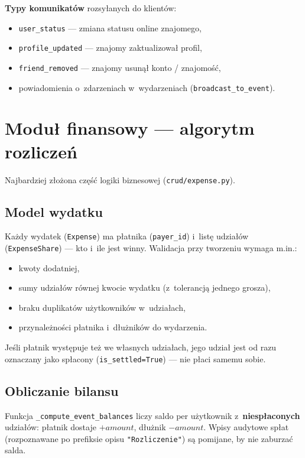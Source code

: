 \documentclass[11pt,a4paper]{article}
\begin{document}
\textbf{Typy komunikatów} rozsyłanych do klientów:
\begin{itemize}[noitemsep]
    \item \texttt{user\_status} --- zmiana statusu online znajomego,
    \item \texttt{profile\_updated} --- znajomy zaktualizował profil,
    \item \texttt{friend\_removed} --- znajomy usunął konto / znajomość,
    \item powiadomienia o~zdarzeniach w~wydarzeniach (\texttt{broadcast\_to\_event}).
\end{itemize}

\section{Moduł finansowy --- algorytm rozliczeń}

Najbardziej złożona część logiki biznesowej (\texttt{crud/expense.py}).

\subsection{Model wydatku}
Każdy wydatek (\texttt{Expense}) ma płatnika (\texttt{payer\_id}) i~listę udziałów
(\texttt{ExpenseShare}) --- kto i~ile jest winny. Walidacja przy tworzeniu wymaga m.in.:
\begin{itemize}[noitemsep]
    \item kwoty dodatniej,
    \item sumy udziałów równej kwocie wydatku (z~tolerancją jednego grosza),
    \item braku duplikatów użytkowników w~udziałach,
    \item przynależności płatnika i~dłużników do wydarzenia.
\end{itemize}
Jeśli płatnik występuje też we własnych udziałach, jego udział jest od razu oznaczany jako
spłacony (\texttt{is\_settled=True}) --- nie płaci samemu sobie.

\subsection{Obliczanie bilansu}
Funkcja \texttt{\_compute\_event\_balances} liczy saldo per użytkownik z~\textbf{niespłaconych}
udziałów: płatnik dostaje $+amount$, dłużnik $-amount$. Wpisy audytowe spłat (rozpoznawane po
prefiksie opisu \texttt{"Rozliczenie"}) są pomijane, by nie zaburzać salda.
\end{document}
